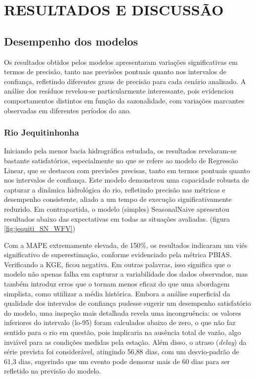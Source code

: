 \chapter{RESULTADOS E DISCUSS\~AO}
\label{cap:capitulo4}

\section{Desempenho dos modelos}

Os resultados obtidos pelos modelos apresentaram variações significativas em termos de precisão, tanto nas previsões pontuais quanto nos intervalos de confiança, refletindo diferentes graus de precisão para cada cenário analisado. A análise dos resíduos revelou-se particularmente interessante, pois evidenciou comportamentos distintos em função da sazonalidade, com variações marcantes observadas em diferentes períodos do ano.

\subsection{Rio Jequitinhonha}

Iniciando pela menor bacia hidrográfica estudada, os resultados revelaram-se bastante satisfatórios, especialmente no que se refere ao modelo de Regressão Linear, que se destacou com previsões precisas, tanto em termos pontuais quanto nos intervalos de confiança. Este modelo demonstrou uma capacidade robusta de capturar a dinâmica hidrológica do rio, refletindo precisão nas métricas e desempenho consistente, aliado a um tempo de execução significativamente reduzido. Em contrapartida, o modelo (simples) SeasonalNaive apresentou resultados abaixo das expectativas em todas as situações avaliadas. (figura \ref{fig:jequiti_SN_WFV})

Com a MAPE extremamente elevada, de 150\%, os resultados indicaram um viés significativo de superestimação, conforme evidenciado pela métrica PBIAS. Verificando a KGE, ficou negativa. Em outras palavras, isso significa que o modelo não apenas falha em capturar a variabilidade dos dados observados, mas também introduz erros que o tornam menos eficaz do que uma abordagem simplista, como utiilizar a média histórica. Embora a análise superficial da qualidade dos intervalos de confiança pudesse sugerir um desempenho satisfatório do modelo, uma inspeção mais detalhada revela uma incongruência: os valores inferiores do intervalo (lo-95) foram calculados abaixo de zero, o que não faz sentido para o rio em questão, pois implicaria na ausência total de vazão, algo inviável para as condições medidas pela estação. Além disso, o atraso (\textit{delay}) da série prevista foi considerável, atingindo 56,88 dias, com um desvio-padrão de 61,3 dias, sugerindo que um evento pode demorar mais de 60 dias para ser refletido na previsão do modelo.

